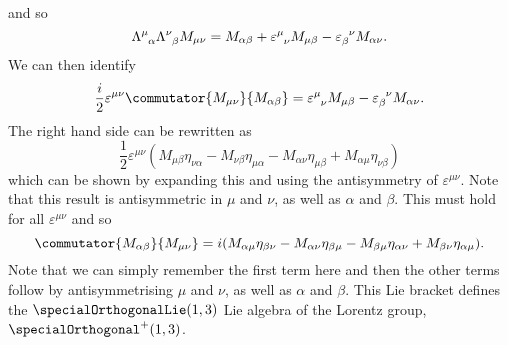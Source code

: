 \documentclass[fleqn]{NotesClass}
\newcommand{\minkowskiMetric}{\eta}
\begin{document}
    and so
    \begin{equation}
        \tensor{\Lambda}{^\mu_\alpha}\tensor{\Lambda}{^\nu_\beta}M_{\mu\nu} = M_{\alpha\beta} + \tensor{\varepsilon}{^\mu_\nu} M_{\mu\beta} - \tensor{\varepsilon}{_\beta^\nu}M_{\alpha\nu}.
    \end{equation}
    We can then identify
    \begin{equation}
        \frac{i}{2}\varepsilon^{\mu\nu}\commutator{M_{\mu\nu}}{M_{\alpha\beta}} = \tensor{\varepsilon}{^\mu_\nu} M_{\mu\beta} - \tensor{\varepsilon}{_\beta^\nu}M_{\alpha\nu}.
    \end{equation}
    The right hand side can be rewritten as
    \begin{equation}
        \frac{1}{2}\varepsilon^{\mu\nu}(M_{\mu\beta} \minkowskiMetric_{\nu\alpha} - M_{\nu\beta}\minkowskiMetric_{\mu\alpha} - M_{\alpha\nu}\minkowskiMetric_{\mu\beta} + M_{\alpha\mu}\minkowskiMetric_{\nu\beta})
    \end{equation}
    which can be shown by expanding this and using the antisymmetry of \(\varepsilon^{\mu\nu}\).
    Note that this result is antisymmetric in \(\mu\) and \(\nu\), as well as \(\alpha\) and \(\beta\).
    This must hold for all \(\varepsilon^{\mu\nu}\) and so
    \begin{equation}
        \commutator{M_{\alpha\beta}}{M_{\mu\nu}} = i(M_{\alpha\mu} \minkowskiMetric_{\beta\nu} - M_{\alpha\nu} \minkowskiMetric_{\beta\mu} - M_{\beta\mu} \minkowskiMetric_{\alpha\nu} + M_{\beta\nu} \minkowskiMetric_{\alpha\mu}).
    \end{equation}
    Note that we can simply remember the first term here and then the other terms follow by antisymmetrising \(\mu\) and \(\nu\), as well as \(\alpha\) and \(\beta\).
    This Lie bracket defines the \(\specialOrthogonalLie(1, 3)\) Lie algebra of the Lorentz group, \(\specialOrthogonal^+(1, 3)\).
    
\end{document}
